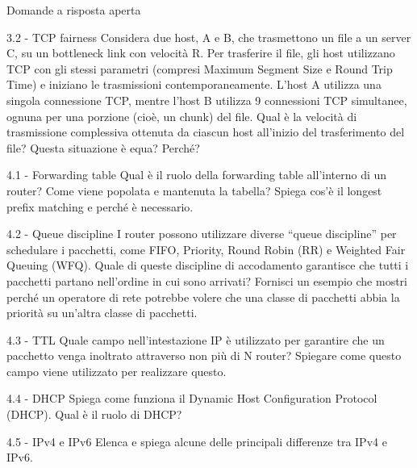 \documentclass[a4paper]{article}
\begin{document}
\begin{quiz}{Domande a risposta aperta}
\begin{essay}[points=1]{3.2 - TCP fairness} 
Considera due host, A e B, che trasmettono un file a un server C, su un bottleneck link con velocità R. Per trasferire il file, gli host utilizzano TCP con gli stessi parametri (compresi Maximum Segment Size e Round Trip Time) e iniziano le trasmissioni contemporaneamente. L'host A utilizza una singola connessione TCP, mentre l'host B utilizza 9 connessioni TCP simultanee, ognuna per una porzione (cioè, un chunk) del file. Qual è la velocità di trasmissione complessiva ottenuta da ciascun host all'inizio del trasferimento del file? Questa situazione è equa? Perché?
\end{essay}


\begin{essay}[points=1]{4.1 - Forwarding table}
Qual è il ruolo della forwarding table all'interno di un router? Come viene popolata e mantenuta la tabella? Spiega cos'è il longest prefix matching e perché è necessario.
\end{essay}

\begin{essay}[points=1]{4.2 - Queue discipline}
I router possono utilizzare diverse ``queue discipline'' per schedulare i pacchetti, come FIFO, Priority, Round Robin (RR) e Weighted Fair Queuing (WFQ). Quale di queste discipline di accodamento garantisce che tutti i pacchetti partano nell'ordine in cui sono arrivati? Fornisci un esempio che mostri perché un operatore di rete potrebbe volere che una classe di pacchetti abbia la priorità su un'altra classe di pacchetti.
\end{essay}

\begin{essay}[points=1]{4.3 - TTL}
Quale campo nell'intestazione IP è utilizzato per garantire che un pacchetto venga inoltrato attraverso non più di N router? Spiegare come questo campo viene utilizzato per realizzare questo.
\end{essay}


\begin{essay}[points=1]{4.4 - DHCP}
Spiega come funziona il Dynamic Host Configuration Protocol (DHCP). Qual è il ruolo di DHCP?
\end{essay}

\begin{essay}[points=1]{4.5 - IPv4 e IPv6}
Elenca e spiega alcune delle principali differenze tra IPv4 e IPv6.
\end{essay}


\end{quiz}
\end{document}

